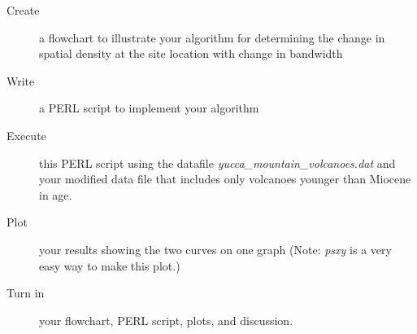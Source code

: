 \documentclass[11pt]{article}
\begin{document}
\begin{description}

\item [Create] a flowchart to illustrate your algorithm for determining the change in spatial density at the site location with change in bandwidth

\item[Write] a PERL script to implement your algorithm

\item[Execute] this PERL script using the datafile {\it yucca\_mountain\_volcanoes.dat} and your modified data file that includes only volcanoes younger than Miocene in age.

\item[Plot] your results showing the two curves on one graph (Note: {\it psxy} is a very easy way to make this plot.)

\item[Turn in] your flowchart, PERL script, plots, and discussion.
 \end{description}
\end{document}
